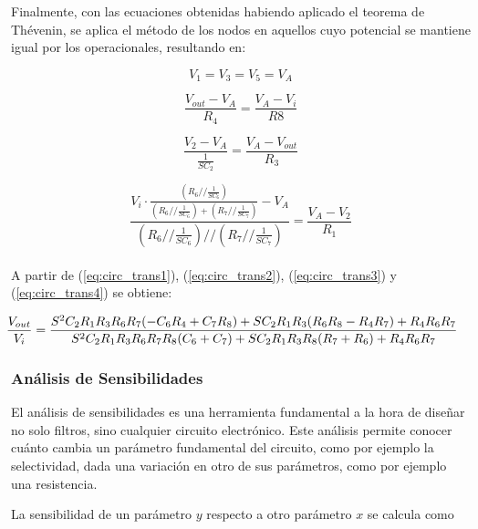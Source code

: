 Finalmente, con las ecuaciones obtenidas habiendo aplicado el teorema de Thévenin, se aplica el método de los nodos en aquellos cuyo potencial se mantiene igual por los operacionales, resultando en:

\begin{equation}
V_1=V_3=V_5=V_A
\label{eq:circ_trans1}
\end{equation}

\begin{equation}
\frac{V_{out} - V_A}{R_4} = \frac{V_A-V_i}{R8}
\label{eq:circ_trans2}
\end{equation}

\begin{equation}
\frac{V_2 - V_A}{\frac{1}{SC_2}} = \frac{V_A-V_{out}}{R_3}
\label{eq:circ_trans3}
\end{equation}

\begin{equation}
\frac{V_i \cdot \frac{\left(R_6 // \frac{1}{SC_6}\right)}{\left(R_6 // \frac{1}{SC_6}\right) + \left(R_7 // \frac{1}{SC_7}\right)} - V_A}{\left(R_6 // \frac{1}{SC_6}\right) // \left(R_7 // \frac{1}{SC_7}\right)} = \frac{V_A-V_2}{R_1}
\label{eq:circ_trans4}
\end{equation} \\

A partir de (\ref{eq:circ_trans1}), (\ref{eq:circ_trans2}), (\ref{eq:circ_trans3}) y (\ref{eq:circ_trans4}) se obtiene:

\begin{equation}
\hspace{-0.5cm}
\frac{V_{out}}{V_i} = \frac{S^2 C_2 R_1 R_3 R_6 R_7 (-C_6 R_4 + C_7 R_8) + S C_2 R_1 R_3 (R_6 R_8 - R_4 R_7) + R_4 R_6 R_7}{S^2 C_2 R_1 R_3 R_6 R_7 R_8 (C_6 + C_7)+S C_2 R_1 R_3 R_8 (R_7 + R_6) + R_4 R_6 R_7}
\label{circ_trans}
\end{equation}

\subsubsection{Análisis de Sensibilidades}
\label{sec:sens}

El análisis de sensibilidades es una herramienta fundamental a la hora de diseñar no solo filtros, sino cualquier circuito electrónico. Este análisis permite conocer cuánto cambia un parámetro fundamental del circuito, como por ejemplo la selectividad, dada una variación en otro de sus parámetros, como por ejemplo una resistencia.

La sensibilidad de un parámetro $y$ respecto a otro parámetro $x$ se calcula como

